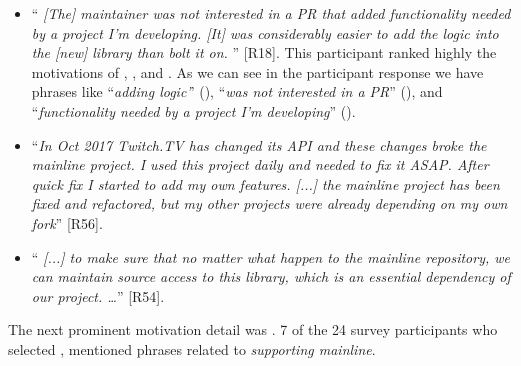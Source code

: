 \begin{itemize}[leftmargin=*]

\item ``\emph{%
[The] maintainer %
was not interested in a PR that added functionality needed by a project I'm developing. [It] was considerably easier to add the logic into the [new] library than bolt it on.%
}'' [R18]. This participant ranked highly the motivations of , , and . As we can see in the participant response we have phrases like ``\textit{adding logic'}' (), ``\textit{was not interested in a PR}'' (), and ``\textit{functionality needed by a project I'm developing}'' ().

\item ``\emph{In Oct 2017 Twitch.TV has changed its API and these changes broke the mainline project. I used this project daily and needed to fix it ASAP. After quick fix I started to add my own features. [...] the mainline project has been fixed and refactored, but my other projects were already depending on my own fork}'' [R56].

\item ``\emph{%
[...] to make sure that no matter what happen to the mainline repository, we can maintain source access to this library, which is an essential dependency of our project. \ldots}'' [R54].

\end{itemize}

\nd The next prominent  motivation detail was .
7 of the 24 survey participants who selected , mentioned phrases related to \emph{supporting mainline}.

